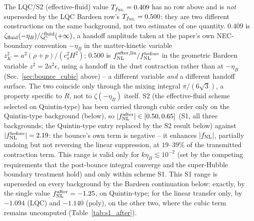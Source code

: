 \documentclass[aps,prd,twocolumn,superscriptaddress,nofootinbib,longbibliography]{revtex4-2}
\newcommand{\fnl}{f_{\rm NL}}
\begin{document}
The LQC/S2 (effective-fluid) value $T_{\fnl}=0.409$ has no row above and is
\emph{not} superseded by the LQC Bardeen row's $T_{\fnl}=0.500$: they are two
different constructions on the same background, not two estimates of one
quantity. $0.409$ is $\zeta_{\rm fluid}(-\eta_B)/\zeta_C^{\rm fluid}(+\infty)$,
a handoff amplitude taken at the paper's own NEC-boundary convention $-\eta_B$
in the matter-kinetic variable $z_K^2=a^2(\rho+p)/(c_s^2H^2)$; $0.500$ is
$f_{\rm NL}^{\rm after,lin}/f_{\rm NL}^{\rm before}$ in the geometric Bardeen
variable $z^2=2a^2\epsilon$, using a handoff in the dust contraction rather
than at $-\eta_B$ (Sec.~\ref{sec:bounce_cubic} above) -- a different variable
\emph{and} a different handoff surface. The two coincide only through the
mixing integral $\pi/(6\sqrt3)$, a property specific to $R$, not to
$\zeta(-\eta_B)$ itself. S2 (the effective-fluid scheme selected on
Quintin-type) has
been carried through cubic order only on the Quintin-type background
(below), so $|\fnl^{\rm after}|\in[0.50,0.65]$ (S1, all three backgrounds;
the Quintin-type entry replaced by the S2 result below) against
$|\fnl^{\rm before}|=2.19$: the bounce's own term is negative -- it enhances
$|\fnl|$, partially undoing but not reversing the linear suppression, at
$19$--$39\%$ of the transmitted contraction term. This range is valid only
for $k\eta_B\lesssim10^{-2}$ (set by the competing requirements that the
post-bounce integral converge and the super-Hubble boundary treatment hold)
and only within scheme S1. This S1 range is superseded on every background
by the Bardeen continuation below: exactly, by the single value
$\fnl^{\rm after}=-1.25$, on Quintin-type; for the linear transfer only,
by $-1.094$ (LQC) and $-1.140$ (poly), on the other two, where the cubic
term remains uncomputed (Table~\ref{tab:s1_after}).
\end{document}
